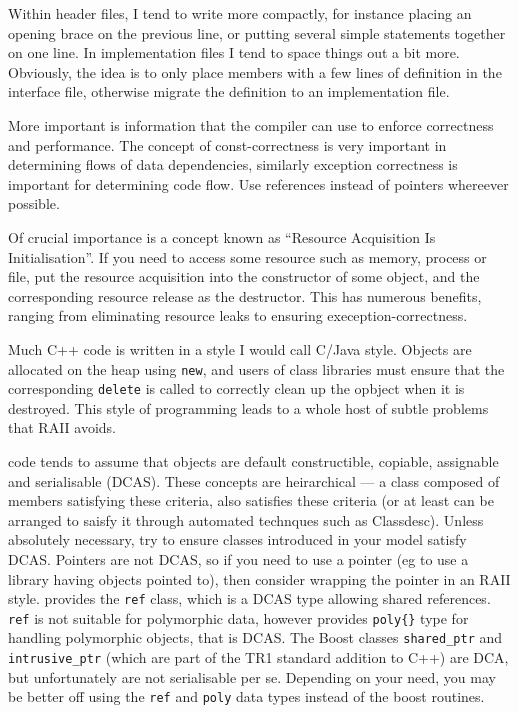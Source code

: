 Within header files, I tend to write more compactly, for instance
placing an opening brace on the previous line, or putting several
simple statements together on one line. In implementation files I tend
to space things out a bit more. Obviously, the idea is to only place
members with a few lines of definition in the interface file,
otherwise migrate the definition to an implementation file.

More important is information that the compiler can use to enforce
correctness and performance. The concept of const-correctness is very
important in determining flows of data dependencies, similarly
exception correctness is important for determining code flow. Use
references instead of pointers whereever possible.

Of crucial importance is a concept known as ``Resource Acquisition Is
Initialisation''. If you need to access some resource such as memory,
process or file, put the resource acquisition into the constructor of
some object, and the corresponding resource release as the
destructor. This has numerous benefits, ranging from eliminating
resource leaks to ensuring exeception-correctness. 

Much C++ code is written in a style I would call C/Java style. Objects
are allocated on the heap using \verb+new+, and users of class
libraries must ensure that the corresponding \verb+delete+ is called
to correctly clean up the opbject when it is destroyed. This style of
programming leads to a whole host of subtle problems that RAII avoids.

\EcoLab{} code tends to assume that objects are default constructible,
copiable, assignable and serialisable (DCAS). These concepts are heirarchical
--- a class composed of members satisfying these criteria, also
satisfies these criteria (or at least can be arranged to saisfy it
through automated technques such as Classdesc). Unless absolutely
necessary, try to ensure classes introduced in your \EcoLab{} model
satisfy DCAS. Pointers are not DCAS, so if you need to use a pointer
(eg to use a library having objects pointed to), then consider
wrapping the pointer in an RAII style. \EcoLab{} provides the
\verb+ref+ class, which is a DCAS type allowing shared
references. \verb+ref+ is not suitable for polymorphic data, however
\EcoLab{} provides \verb+poly{}+ type for handling polymorphic
objects, that is DCAS. The Boost classes \verb+shared_ptr+ and
\verb+intrusive_ptr+ (which are part of the TR1 standard addition to
C++) are DCA, but unfortunately are not serialisable per se. Depending on
your need, you may be better off using the \EcoLab{} \verb+ref+ and
\verb+poly+ data types instead of the boost routines.
